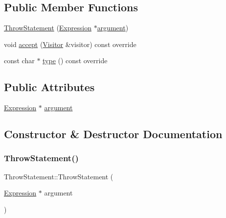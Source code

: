 \subsection*{Public Member Functions}
\begin{DoxyCompactItemize}
\item 
\hyperlink{struct_throw_statement_a63816e51d36969b20b9d58f3dbc7b3d0}{Throw\+Statement} (\hyperlink{struct_expression}{Expression} $\ast$\hyperlink{struct_throw_statement_a87b057f38ecbe03a687dec1204a7387a}{argument})
\item 
void \hyperlink{struct_throw_statement_a867eb5afd44e7a7dca0887143a42162a}{accept} (\hyperlink{struct_visitor}{Visitor} \&visitor) const override
\item 
const char $\ast$ \hyperlink{struct_throw_statement_a9e5f00ea3855830711544b28c575b11b}{type} () const override
\end{DoxyCompactItemize}
\subsection*{Public Attributes}
\begin{DoxyCompactItemize}
\item 
\hyperlink{struct_expression}{Expression} $\ast$ \hyperlink{struct_throw_statement_a87b057f38ecbe03a687dec1204a7387a}{argument}
\end{DoxyCompactItemize}


\subsection{Constructor \& Destructor Documentation}
\mbox{\label{struct_throw_statement_a63816e51d36969b20b9d58f3dbc7b3d0}} 
\subsubsection{\texorpdfstring{Throw\+Statement()}{ThrowStatement()}}
{\footnotesize\ttfamily Throw\+Statement\+::\+Throw\+Statement (\begin{DoxyParamCaption}\item[{\hyperlink{struct_expression}{Expression} $\ast$}]{argument }\end{DoxyParamCaption})\hspace{0.3cm}{\ttfamily [inline]}}



